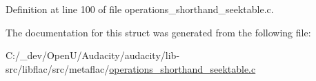 Definition at line 100 of file operations\+\_\+shorthand\+\_\+seektable.\+c.



The documentation for this struct was generated from the following file\+:\begin{DoxyCompactItemize}
\item 
C\+:/\+\_\+dev/\+Open\+U/\+Audacity/audacity/lib-\/src/libflac/src/metaflac/\hyperlink{operations__shorthand__seektable_8c}{operations\+\_\+shorthand\+\_\+seektable.\+c}\end{DoxyCompactItemize}
